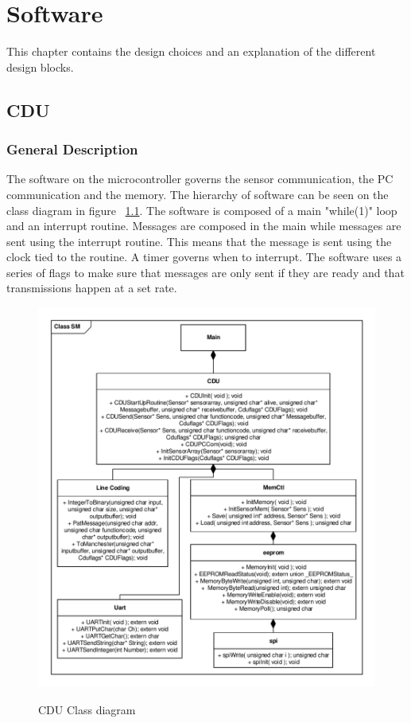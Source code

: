 \chapter{Software}
This chapter contains the design choices and an explanation of the different design blocks.

\section{CDU}
\subsection{General Description}
The software on the microcontroller governs the sensor communication, the PC communication and the memory. The hierarchy of software can be seen on the class diagram in figure ~\ref{fig:cduclassd}. The software is composed of a main "while(1)" loop and an interrupt routine. Messages are composed in the main while messages are sent using the interrupt routine. This means that the message is sent using the clock tied to the routine. A timer governs when to interrupt. The software uses a series of flags to make sure that messages are only sent if they are ready and that transmissions happen at a set rate.\\

\begin{figure}[H]
\centering
\includegraphics[scale=0.8]{billeder/CDUClassDiagramme}
\label{fig:cduclassd}
\caption{CDU Class diagram}
\end{figure}
